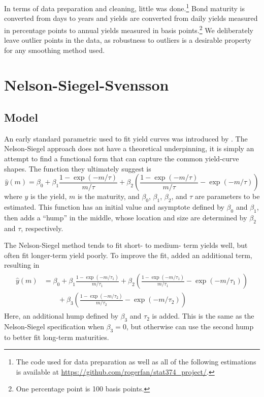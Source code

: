 \documentclass[12pt]{article}
\begin{document}
In terms of data preparation and cleaning, little was done.\footnote{The code used for data preparation as well as all of the following estimations is available at \url{https://github.com/rogerfan/stat374_project/}.} Bond maturity is converted from days to years and yields are converted from daily yields measured in percentage points to annual yields measured in basis points.\footnote{One percentage point is 100 basis points.} We deliberately leave outlier points in the data, as robustness to outliers is a desirable property for any smoothing method used.


\section{Nelson-Siegel-Svensson}

\subsection{Model}

An early standard parametric used to fit yield curves was introduced by \citet{nelsonsiegel1987}. The Nelson-Siegel approach does not have a theoretical underpinning, it is simply an attempt to find a functional form that can capture the common yield-curve shapes. The function they ultimately suggest is
\begin{equation}
\hat{y}(m) = \beta_0
    + \beta_1 \frac{1-\exp(-m/\tau)}{m/\tau}
    + \beta_2 \left( \frac{1-\exp(-m/\tau)}{m/\tau} - \exp(-m/\tau) \right)
\label{eq:ns}
\end{equation}
where $y$ is the yield, $m$ is the maturity, and $\beta_0$, $\beta_1$, $\beta_2$, and $\tau$ are parameters to be estimated. This function has an initial value and asymptote defined by $\beta_0$ and $\beta_1$, then adds a ``hump'' in the middle, whose location and size are determined by $\beta_2$ and $\tau$, respectively.

The Nelson-Siegel method tends to fit short- to medium- term yields well, but often fit longer-term yield poorly. To improve the fit, \citet{svensson1994} added an additional term, resulting in
\begin{align}
\begin{split}
\hat{y}(m) &= \beta_0
    + \beta_1 \frac{1-\exp(-m/\tau_1)}{m/\tau_1}
    + \beta_2 \left( \frac{1-\exp(-m/\tau_1)}{m/\tau_1} - \exp(-m/\tau_1) \right) \\
    &\qquad+ \beta_3 \left( \frac{1-\exp(-m/\tau_2)}{m/\tau_2} - \exp(-m/\tau_2) \right)
\end{split} \label{eq:svensson}
\end{align}
Here, an additional hump defined by $\beta_3$ and $\tau_2$ is added. This is the same as the Nelson-Siegel specification when $\beta_3 = 0$, but otherwise can use the second hump to better fit long-term maturities.
\end{document}
